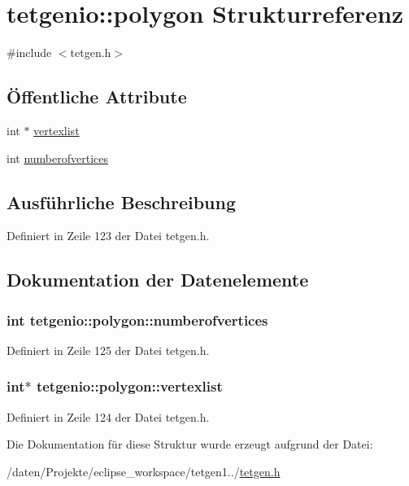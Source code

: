 \hypertarget{structtetgenio_1_1polygon}{\section{tetgenio\-:\-:polygon Strukturreferenz}
\label{structtetgenio_1_1polygon}
}


{\ttfamily \#include $<$tetgen.\-h$>$}

\subsection*{Öffentliche Attribute}
\begin{DoxyCompactItemize}
\item 
int $\ast$ \hyperlink{structtetgenio_1_1polygon_a3cc2d3756bc093db5c252dd8f42a5001}{vertexlist}
\item 
int \hyperlink{structtetgenio_1_1polygon_a019f9c62f145cf7d85227f401fcdba38}{numberofvertices}
\end{DoxyCompactItemize}


\subsection{Ausführliche Beschreibung}


Definiert in Zeile 123 der Datei tetgen.\-h.



\subsection{Dokumentation der Datenelemente}
\hypertarget{structtetgenio_1_1polygon_a019f9c62f145cf7d85227f401fcdba38}{
\subsubsection[{numberofvertices}]{\setlength{\rightskip}{0pt plus 5cm}int tetgenio\-::polygon\-::numberofvertices}}\label{structtetgenio_1_1polygon_a019f9c62f145cf7d85227f401fcdba38}


Definiert in Zeile 125 der Datei tetgen.\-h.

\hypertarget{structtetgenio_1_1polygon_a3cc2d3756bc093db5c252dd8f42a5001}{
\subsubsection[{vertexlist}]{\setlength{\rightskip}{0pt plus 5cm}int$\ast$ tetgenio\-::polygon\-::vertexlist}}\label{structtetgenio_1_1polygon_a3cc2d3756bc093db5c252dd8f42a5001}


Definiert in Zeile 124 der Datei tetgen.\-h.



Die Dokumentation für diese Struktur wurde erzeugt aufgrund der Datei\-:\begin{DoxyCompactItemize}
\item 
/daten/\-Projekte/eclipse\-\_\-workspace/tetgen1../\hyperlink{tetgen_8h}{tetgen.\-h}\end{DoxyCompactItemize}
